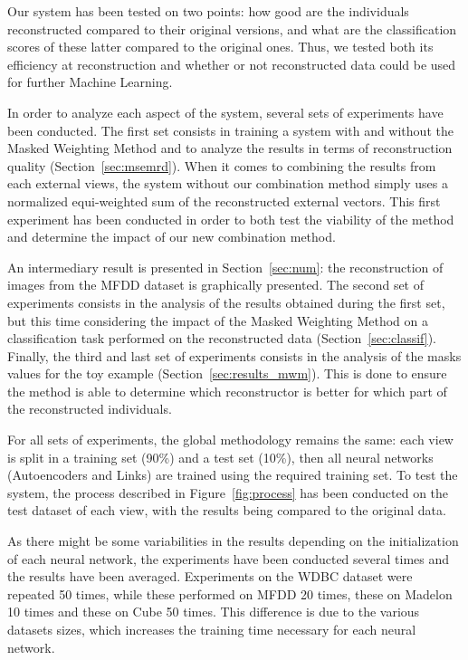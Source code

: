Our system has been tested on two points: how good are the individuals reconstructed compared to their original versions, and what are the classification scores of these latter compared to the original ones. Thus, we tested both its efficiency at reconstruction and whether or not reconstructed data could be used for further Machine Learning.

In order to analyze each aspect of the system, several sets of experiments have been conducted.	The first set consists in training a system with and without the Masked Weighting Method and to analyze the results in terms of reconstruction quality (Section~\ref{sec:msemrd}). When it comes to combining the results from each external views, the system without our combination method simply uses a normalized equi-weighted sum of the reconstructed external vectors. This first experiment has been conducted in order to both test the viability of the method and determine the impact of our new combination method.\@

An intermediary result is presented in Section~\ref{sec:num}: the reconstruction of images from the MFDD dataset is graphically presented. The second set of experiments consists in the analysis of the results obtained during the first set, but this time considering the impact of the Masked Weighting Method on a classification task performed on the reconstructed data (Section~\ref{sec:classif}). Finally, the third and last set of experiments consists in the analysis of the masks values for the toy example (Section~\ref{sec:results_mwm}). This is done to ensure the method is able to determine which reconstructor is better for which part of the reconstructed individuals.
	
For all sets of experiments, the global methodology remains the same: each view is split in a training set (90\%) and a test set (10\%), then all neural networks (Autoencoders and Links) are trained using the required training set. To test the system, the process described in Figure~\ref{fig:process} has been conducted on the test dataset of each view, with the results being compared to the original data.
	
As there might be some variabilities in the results depending on the initialization of each neural network, the experiments have been conducted several times and the results have been averaged. Experiments on the WDBC dataset were repeated 50 times, while these performed on MFDD 20 times, these on Madelon 10 times and these on Cube 50 times. This difference is due to the various datasets sizes, which increases the training time necessary for each neural network.
	
